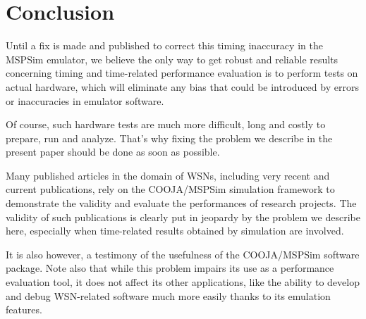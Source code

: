 \documentclass[a4paper,10pt]{article}
\begin{document}

\section{Conclusion}

Until a fix is made and published to correct this timing inaccuracy
in the MSPSim emulator, we believe the only way to get robust and reliable
results concerning timing and time-related performance evaluation is
to perform tests on actual hardware, which will eliminate any bias
that could be introduced by errors or inaccuracies in emulator software.

Of course, such hardware tests are much more difficult, long and
costly to prepare, run and analyze. That's why fixing the problem
we describe in the present paper should be done as soon as possible.

Many published articles in the domain of WSNs, including very recent
and current publications, rely on the COOJA/MSPSim simulation framework
to demonstrate the validity and evaluate the performances of research
projects. The validity of such publications is clearly put in jeopardy
by the problem we describe here, especially when time-related results
obtained by simulation are involved.

It is also however, a testimony of the usefulness of the COOJA/MSPSim
software package. Note also that while this problem impairs its use
as a performance evaluation tool, it does not affect its other applications,
like the ability to develop and debug WSN-related software much more easily
thanks to its emulation features.



\vfill

{\small
}
\end{document}
